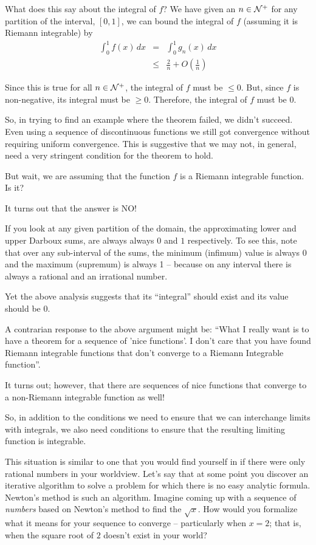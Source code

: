 \documentclass{article}
\begin{document}
What does this say about the integral of $f$? 
We have given an $n \in {\cal N}^+$ for any partition of the interval, $[0,1]$, we can bound the integral of $f$ 
(assuming it is Riemann integrable) by
\begin{eqnarray*}
	\int_0^1 f(x) \, dx & =   & \int_0^1 g_{n}(x) \, dx \\
						& \le & \frac{2}{n} + O\left(\frac{1}{n}\right)
\end{eqnarray*}

Since this is true for all $n \in {\cal N}^+$, the integral of $f$ must be $\le 0$. 
But, since $f$ is non-negative, its integral must be $\ge 0$. Therefore, the 
integral of $f$ must be $0$.

So, in trying to find an example where the theorem failed, we didn't succeed. 
Even using a sequence of discontinuous functions we still got convergence without 
requiring uniform convergence. This is suggestive that we may not, in general, 
need a very stringent condition for the theorem to hold.

But wait, we are assuming that the function $f$ is a Riemann integrable function. 
Is it?

It turns out that the answer is NO! 

If you look at any given partition of the domain, the approximating lower 
and upper Darboux sums, are always 
always $0$ and $1$ respectively. To see this, note that 
over any sub-interval of the sums, the minimum (infimum) value is always 0 and 
the maximum (supremum) is always 1 -- because on any interval there is always a 
rational and an irrational number.

Yet the above analysis suggests that its ``integral'' should exist and its value 
should be $0$.

A contrarian response to the above argument might be:
``What I really want is to have a theorem for a sequence of 
'nice functions'. I don't care that you have found Riemann integrable functions that
don't converge to a Riemann Integrable function''. 

It turns out; however, that there are sequences of nice functions that converge 
to a non-Riemann integrable function as well!

So, in addition to the conditions we need to ensure that we can interchange 
limits with integrals, we also need conditions to ensure that the 
resulting limiting function is integrable.

This situation is similar to one that you would find yourself in if there were 
only rational numbers in your worldview. Let's say that at some point 
you discover an iterative 
algorithm to solve a problem for which there is no easy analytic formula. 
Newton's method is such an algorithm. Imagine coming up with a sequence of {\em numbers\/}
based on Newton's method to find the $\sqrt{x}$. How would you formalize what 
it means for your sequence to converge -- particularly when $x = 2$; that is, when the
square root of $2$ doesn't exist in your world?
\end{document}
